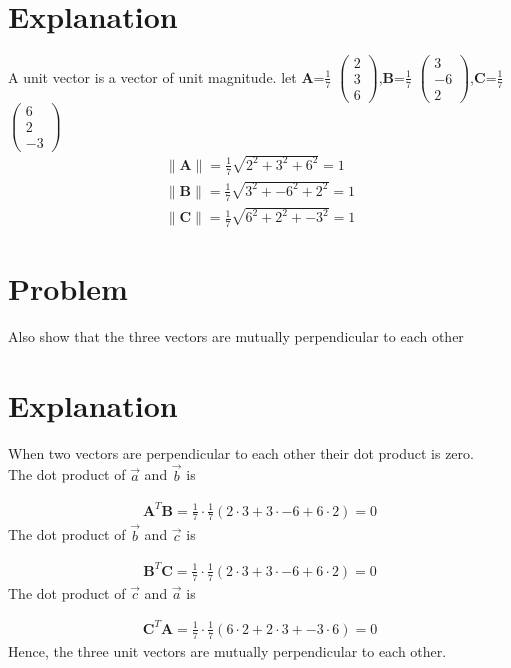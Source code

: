 \documentclass[journal,12pt,twocolumn]{IEEEtran}
\newcommand{\norm}[1]{\| #1 \|}
\begin{document}
\section{Explanation}
A unit vector is a vector of unit magnitude.
\vspace{0.5cm} let $\bm{A}$=\(\frac{1}{7}\) $\begin{pmatrix}2 \\3 \\6\end{pmatrix}$,$\bm{B}$=\(\frac{1}{7}\) $\begin{pmatrix}3 \\-6 \\2\end{pmatrix}$,$\bm{C}$=\(\frac{1}{7}\) $\begin{pmatrix}6 \\2 \\-3\end{pmatrix}$\\
\begin{align*}
    \norm{\bm{A}}=\frac{1}{7}\sqrt{2^2+3^2+6^2}=1\\
    \norm{\bm{B}}=\frac{1}{7}\sqrt{3^2+-6^2+2^2}=1\\
    \norm{\bm{C}}=\frac{1}{7}\sqrt{6^2+2^2+-3^2}=1
\end{align*}
\section{Problem}
Also show that the three vectors are mutually perpendicular to each other
\section{Explanation}
\noindent
When two vectors are perpendicular to each other their dot product is zero.\\
The dot product of $\vec{a}$ and $\vec{b}$ is\par
\begin{align}
    \bm{A}^T\bm{B}=\frac{1}{7}\cdot\frac{1}{7}(2\cdot3+3\cdot-6+6\cdot2)=0
\end{align}
The dot product of $\vec{b}$ and $\vec{c}$ is \par
\begin{align}
    \bm{B}^T\bm{C}=\frac{1}{7}\cdot\frac{1}{7}(2\cdot3+3\cdot-6+6\cdot2)=0
\end{align}
The dot product of $\vec{c}$ and $\vec{a}$ is \par
\begin{align}
    \bm{C}^T\bm{A}=\frac{1}{7}\cdot\frac{1}{7}(6\cdot2+2\cdot3+-3\cdot6)=0
\end{align}
Hence, the three unit vectors are mutually perpendicular to each other.
\end{document}
